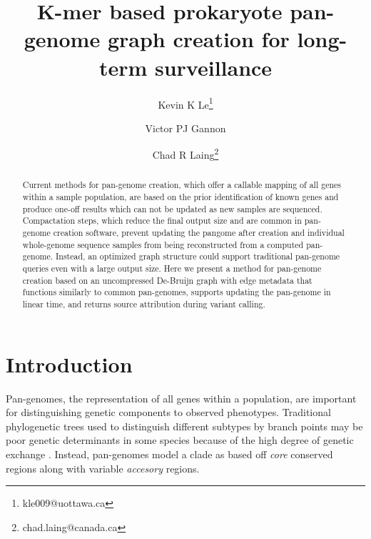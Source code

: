 \documentclass{article}
\begin{document}
\title{K-mer based prokaryote pan-genome graph creation for long-term surveillance}

\author[1]{Kevin K Le\thanks{kle009@uottawa.ca}}
\author[1]{Victor PJ Gannon}
\author[2]{Chad R Laing\thanks{chad.laing@canada.ca}}

\renewcommand\Authands{ and }

\maketitle

\begin{abstract}

Current methods for pan-genome creation, which offer a callable mapping of all genes within a sample population, are based on the prior identification of known genes and produce one-off results which can not be updated as new samples are sequenced.
Compactation steps, which reduce the final output size and are common in pan-genome creation software, prevent updating the pangome after creation and individual whole-genome sequence samples from being reconstructed from a computed pan-genome.
Instead, an optimized graph structure could support traditional pan-genome queries even with a large output size.
Here we present a method for pan-genome creation based on an uncompressed De-Bruijn graph with edge metadata that functions similarly to common pan-genomes, supports updating the pan-genome in linear time, and returns source attribution during variant calling.


\end{abstract}


\section{Introduction}

Pan-genomes, the representation of all genes within a population, are important for distinguishing genetic components to observed phenotypes.
Traditional phylogenetic trees used to distinguish different subtypes by branch points may be poor genetic determinants in some species \cite{vernikos2015ten} because of the high degree of genetic exchange \cite{medini2005microbial}.
Instead, pan-genomes model a clade as based off \textit{core} conserved regions along with variable \textit{accesory} regions.
\end{document}
